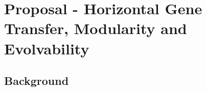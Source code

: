 \section{Proposal - Horizontal Gene Transfer, Modularity and Evolvability}


\subsection{Background}
